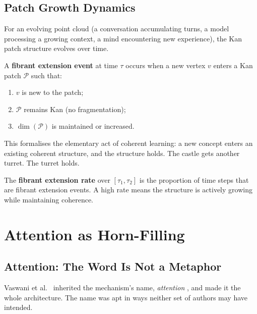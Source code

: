 \subsection{Patch Growth Dynamics}

For an evolving point cloud (a conversation accumulating turns, a model processing a growing context, a mind encountering new experience), the Kan patch structure evolves over time.

\begin{definition}
\label{def:fibrant-extension}
A \textbf{fibrant extension event} at time $\tau$ occurs when a new vertex $v$ enters a Kan patch $\mathcal{P}$ such that:
\begin{enumerate}
\item $v$ is new to the patch;
\item $\mathcal{P}$ remains Kan (no fragmentation);
\item $\dim(\mathcal{P})$ is maintained or increased.
\end{enumerate}
\end{definition}

This formalises the elementary act of coherent learning: a new concept enters an existing coherent structure, and the structure holds. The castle gets another turret. The turret holds.

\begin{definition}
The \textbf{fibrant extension rate} over $[\tau_1, \tau_2]$ is the proportion of time steps that are fibrant extension events. A high rate means the structure is actively growing while maintaining coherence.
\end{definition}


\section{Attention as Horn-Filling}
\label{sec:attention}

\subsection{Attention: The Word Is Not a Metaphor}

Vaswani et al.\ \cite{vaswani2017attention} inherited the mechanism's name, \emph{attention} \cite{bahdanau2015}, and made it the whole architecture. The name was apt in ways neither set of authors may have intended.

